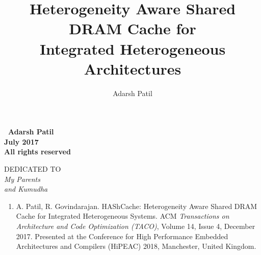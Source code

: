 \documentclass[12pt,twoside,a4paper, openright]{report}
\newcommand{\cachename}{HAShCache}
\begin{document}
\begin{frontmatter}
\title{Heterogeneity Aware Shared DRAM Cache for \\ Integrated Heterogeneous Architectures}
\author{Adarsh Patil}
\enggfaculty
\mscengg
\iisclogotrue %
\figurespagefalse %
\tablespagetrue %
\maketitle

\vspace*{\fill}
\vspace{10em}
\begin{center}
	\Large\bf \textcopyright \ Adarsh Patil\\
	\Large\bf July 2017\\
	\Large\bf All rights reserved
\end{center}
\vspace*{\fill}
\thispagestyle{empty}


\begin{dedication}
\newpage
\vspace*{\fill}
\begin{center}
	DEDICATED TO \\
	\Large\it My Parents  \\
	\Large\it and Kumudha
\end{center}
\vspace*{\fill}
\thispagestyle{empty}
\newpage
\thispagestyle{empty}
\end{dedication}


\acknowledgements
{}



\publications
\begin{enumerate}
	\item A. Patil, R. Govindarajan. \cachename: Heterogeneity Aware Shared DRAM Cache for Integrated Heterogeneous Systems. ACM \textit{Transactions on Architecture and Code Optimization (TACO)}, Volume 14, Issue 4, December 2017. Presented at the Conference for High Performance Embedded Architectures and Compilers (HiPEAC) 2018, Manchester, United Kingdom.
\end{enumerate}



\begin{abstract}

\end{abstract}

\makecontents

	
\cleardoublepage
{}
\listoffigures

\newpage
{}
\listofalgorithms
\newpage
\thispagestyle{empty}
\cleardoublepage


\end{frontmatter}
















\end{document}

